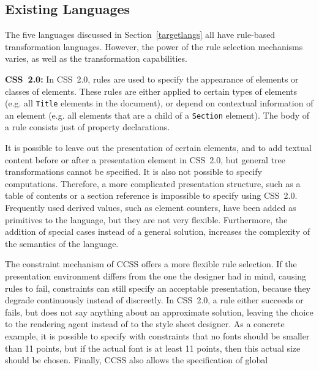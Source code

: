 \subsection{Existing Languages}

\par The five languages discussed in Section~\ref{targetlangs} all have rule-based transformation languages. However,
        the power of the rule selection mechanisms varies, as well as the
        transformation capabilities.{\bf }
\par {\bf CSS~2.0:} In CSS~2.0, rules are used to specify the
        appearance of elements or classes of elements. These rules are either applied
        to certain types of elements (e.g. all \texttt{Title} elements in the
        document), or depend on contextual information of an element (e.g. all elements
        that are a child of a \texttt{Section} element). The body of a rule consists
        just of property declarations.
\par It is possible to leave out the presentation of certain elements, and
        to add textual content before or after a presentation element in CSS~2.0,
        but general tree transformations cannot be specified. It is also not possible
        to specify computations. Therefore, a more complicated presentation structure,
        such as a table of contents or a section reference is impossible to specify
        using CSS~2.0. Frequently used derived values, such as element counters,
        have been added as primitives to the language, but they are not very flexible.
        Furthermore, the addition of special cases instead of a general solution,
        increases the complexity of the semantics of the language.
\par {} The constraint mechanism of CCSS offers a
        more flexible rule selection. If the presentation environment differs from the
        one the designer had in mind, causing rules to fail, constraints can still
        specify an acceptable presentation, because they degrade continuously instead
        of discreetly. In CSS~2.0, a rule either succeeds or fails, but does not
        say anything about an approximate solution, leaving the choice to the rendering
        agent instead of to the style sheet designer. As a concrete example, it is
        possible to specify with constraints that no fonts should be smaller than 11
        points, but if the actual font is at least 11 points, then this actual size
        should be chosen. Finally, CCSS also allows the specification of global
